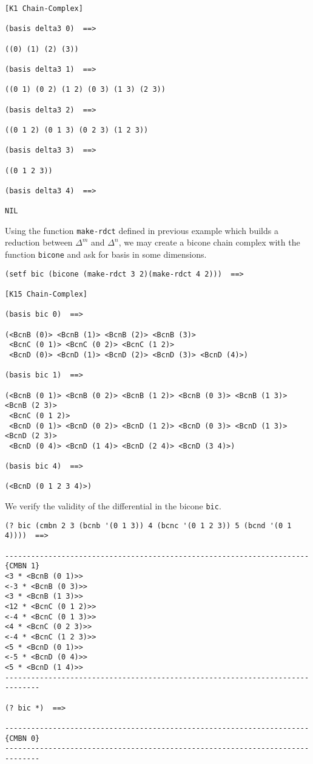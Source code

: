 {{\begin{verbatim}
[K1 Chain-Complex]

(basis delta3 0)  ==>

((0) (1) (2) (3))

(basis delta3 1)  ==>

((0 1) (0 2) (1 2) (0 3) (1 3) (2 3))

(basis delta3 2)  ==>

((0 1 2) (0 1 3) (0 2 3) (1 2 3))

(basis delta3 3)  ==>

((0 1 2 3))

(basis delta3 4)  ==>

NIL
\end{verbatim}}
Using the function {\tt make-rdct} defined in previous example which builds a reduction between 
$\Delta^m$ and $\Delta^n$, we may
create a bicone chain complex with the function {\tt bicone} and ask for basis in some dimensions.
{\footnotesize\begin{verbatim}
(setf bic (bicone (make-rdct 3 2)(make-rdct 4 2)))  ==>

[K15 Chain-Complex]

(basis bic 0)  ==>

(<BcnB (0)> <BcnB (1)> <BcnB (2)> <BcnB (3)> 
 <BcnC (0 1)> <BcnC (0 2)> <BcnC (1 2)> 
 <BcnD (0)> <BcnD (1)> <BcnD (2)> <BcnD (3)> <BcnD (4)>)

(basis bic 1)  ==>

(<BcnB (0 1)> <BcnB (0 2)> <BcnB (1 2)> <BcnB (0 3)> <BcnB (1 3)> <BcnB (2 3)> 
 <BcnC (0 1 2)> 
 <BcnD (0 1)> <BcnD (0 2)> <BcnD (1 2)> <BcnD (0 3)> <BcnD (1 3)> <BcnD (2 3)> 
 <BcnD (0 4)> <BcnD (1 4)> <BcnD (2 4)> <BcnD (3 4)>)

(basis bic 4)  ==>

(<BcnD (0 1 2 3 4)>)
\end{verbatim}}
We verify the validity of the differential in the bicone {\tt bic}.
{\footnotesize\begin{verbatim}
(? bic (cmbn 2 3 (bcnb '(0 1 3)) 4 (bcnc '(0 1 2 3)) 5 (bcnd '(0 1 4))))  ==>

----------------------------------------------------------------------{CMBN 1}
<3 * <BcnB (0 1)>>
<-3 * <BcnB (0 3)>>
<3 * <BcnB (1 3)>>
<12 * <BcnC (0 1 2)>>
<-4 * <BcnC (0 1 3)>>
<4 * <BcnC (0 2 3)>>
<-4 * <BcnC (1 2 3)>>
<5 * <BcnD (0 1)>>
<-5 * <BcnD (0 4)>>
<5 * <BcnD (1 4)>>
------------------------------------------------------------------------------

(? bic *)  ==>

----------------------------------------------------------------------{CMBN 0}
------------------------------------------------------------------------------
\end{verbatim}}

}
